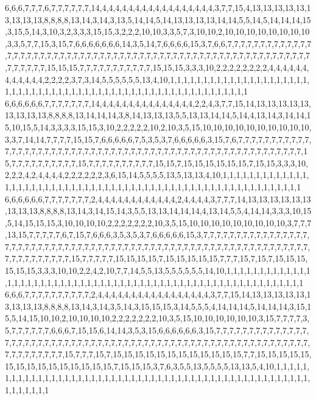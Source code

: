 6,6,6,7,7,7,6,7,7,7,7,7,7,14,4,4,4,4,4,4,4,4,4,4,4,4,4,4,4,4,4,3,7,7,15,4,13,13,13,13,13,13,13,13,13,8,8,8,8,13,14,3,14,3,13,5,14,14,5,14,13,13,13,13,14,14,5,5,14,5,14,14,14,15,3,15,5,14,3,10,3,2,3,3,3,15,15,3,2,2,2,10,10,3,3,5,7,3,10,10,2,10,10,10,10,10,10,10,10,3,3,5,7,7,15,3,15,7,6,6,6,6,6,6,6,14,3,5,14,7,6,6,6,6,15,3,7,6,6,7,7,7,7,7,7,7,7,7,7,7,7,7,7,7,7,7,7,7,7,7,7,7,7,7,7,7,7,7,7,7,7,7,7,7,7,7,7,7,7,7,7,7,7,7,7,7,7,7,7,7,7,7,7,7,7,7,7,7,7,7,7,7,7,7,15,15,15,7,7,7,7,7,7,7,7,7,7,7,15,15,15,3,3,3,10,2,2,2,2,2,2,2,2,4,4,4,4,4,4,4,4,4,4,4,4,2,2,2,2,3,7,3,14,5,5,5,5,5,5,13,4,10,1,1,1,1,1,1,1,1,1,1,1,1,1,1,1,1,1,1,1,1,1,1,1,1,1,1,1,1,1,1,1,1,1,1,1,1,1,1,1,1,1,1,1,1,1,1,1,1,1,1,1,1,1,1,1,1,1,1
6,6,6,6,6,6,7,7,7,7,7,7,7,14,4,4,4,4,4,4,4,4,4,4,4,4,4,4,2,2,4,3,7,7,15,14,13,13,13,13,13,13,13,13,13,8,8,8,8,13,14,14,14,3,8,14,13,13,13,5,5,13,13,14,14,5,14,4,13,14,3,14,14,15,10,15,5,14,3,3,3,3,15,15,3,10,2,2,2,2,2,10,2,10,3,5,15,10,10,10,10,10,10,10,10,10,10,3,3,7,14,14,7,7,7,7,15,15,7,6,6,6,6,6,7,5,3,5,3,7,6,6,6,6,6,3,15,7,6,7,7,7,7,7,7,7,7,7,7,7,7,7,7,7,7,7,7,7,7,7,7,7,7,7,7,7,7,7,7,7,7,7,7,7,7,7,7,7,7,7,7,7,7,7,7,7,7,7,7,7,7,7,7,7,7,15,7,7,7,7,7,7,7,7,7,7,15,7,7,7,7,7,7,7,7,7,7,15,15,7,15,15,15,15,15,15,7,15,15,3,3,3,10,2,2,2,4,2,4,4,4,4,2,2,2,2,2,2,3,6,15,14,5,5,5,5,13,5,13,13,4,10,1,1,1,1,1,1,1,1,1,1,1,1,1,1,1,1,1,1,1,1,1,1,1,1,1,1,1,1,1,1,1,1,1,1,1,1,1,1,1,1,1,1,1,1,1,1,1,1,1,1,1,1,1,1,1,1,1,1
6,6,6,6,6,6,7,7,7,7,7,7,7,2,4,4,4,4,4,4,4,4,4,4,4,4,2,4,4,4,4,3,7,7,7,14,13,13,13,13,13,13,13,13,13,8,8,8,8,13,14,3,14,15,14,3,5,5,13,13,14,14,14,4,13,14,5,5,4,14,14,3,3,3,10,15,5,14,15,15,15,3,10,10,10,10,2,2,2,2,2,2,2,10,3,5,15,10,10,10,10,10,10,10,10,10,3,7,7,7,13,15,7,7,7,7,7,6,7,15,7,6,6,6,3,5,3,5,3,7,6,6,6,6,6,15,3,7,7,7,7,7,7,7,7,7,7,7,7,7,7,7,7,7,7,7,7,7,7,7,7,7,7,7,7,7,7,7,7,7,7,7,7,7,7,7,7,7,7,7,7,7,7,7,7,7,7,7,7,7,7,7,7,7,7,7,7,7,7,7,7,7,7,7,7,7,7,7,7,15,7,7,7,7,7,15,15,15,15,7,15,15,15,15,15,7,7,7,15,7,15,7,15,15,15,15,15,15,3,3,3,10,10,2,2,4,2,10,7,7,14,5,5,13,5,5,5,5,5,5,14,10,1,1,1,1,1,1,1,1,1,1,1,1,1,1,1,1,1,1,1,1,1,1,1,1,1,1,1,1,1,1,1,1,1,1,1,1,1,1,1,1,1,1,1,1,1,1,1,1,1,1,1,1,1,1,1,1,1,1
6,6,6,7,7,7,7,7,7,7,7,7,7,2,4,4,4,4,4,4,4,4,4,4,4,4,4,4,4,4,4,3,7,7,15,14,13,13,13,13,13,13,13,13,13,8,8,8,8,13,14,3,14,3,5,14,3,15,15,15,3,14,5,5,5,4,14,14,14,5,14,14,14,3,15,15,5,14,15,10,10,2,10,10,10,10,2,2,2,2,2,2,2,10,3,5,15,10,10,10,10,10,10,3,15,7,7,7,7,3,5,7,7,7,7,7,7,6,6,6,7,15,15,6,14,14,3,5,3,15,6,6,6,6,6,6,3,15,7,7,7,7,7,7,7,7,7,7,7,7,7,7,7,7,7,7,7,7,7,7,7,7,7,7,7,7,7,7,7,7,7,7,7,7,7,7,7,7,7,7,7,7,7,7,7,7,7,7,7,7,7,7,7,7,7,7,7,7,7,7,7,7,7,7,7,7,7,15,7,7,7,15,7,15,15,15,15,15,15,15,15,15,15,15,15,7,7,15,15,15,15,15,15,15,15,15,15,15,15,15,15,15,7,15,15,15,3,7,6,3,5,5,13,5,5,5,5,13,13,5,4,10,1,1,1,1,1,1,1,1,1,1,1,1,1,1,1,1,1,1,1,1,1,1,1,1,1,1,1,1,1,1,1,1,1,1,1,1,1,1,1,1,1,1,1,1,1,1,1,1,1,1,1,1,1,1,1,1,1,1
